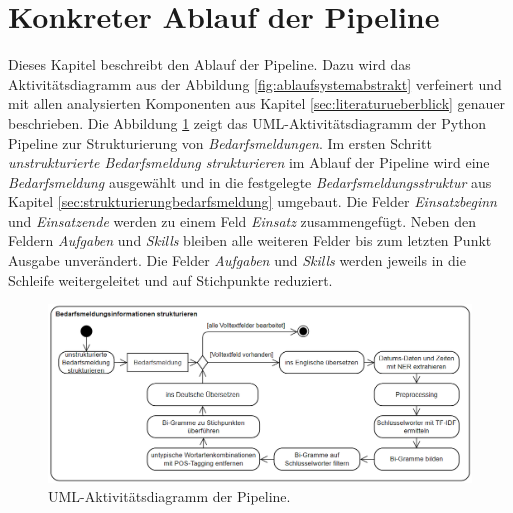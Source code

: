 \section{Konkreter Ablauf der Pipeline}
Dieses Kapitel beschreibt den Ablauf der Pipeline. Dazu wird das Aktivitätsdiagramm aus der Abbildung \ref{fig:ablaufsystemabstrakt} verfeinert und mit allen analysierten Komponenten aus Kapitel \ref{sec:literaturueberblick} genauer beschrieben. Die Abbildung \ref{fig:flowchart} zeigt das UML-Aktivitätsdiagramm der Python Pipeline zur Strukturierung von \emph{Bedarfsmeldungen}. Im ersten Schritt \emph{unstrukturierte Bedarfsmeldung strukturieren} im Ablauf der Pipeline wird eine \emph{Bedarfsmeldung} ausgewählt und in die festgelegte \emph{Bedarfsmeldungsstruktur} aus Kapitel \ref{sec:strukturierungbedarfsmeldung} umgebaut. Die Felder \emph{Einsatzbeginn} und \emph{Einsatzende} werden zu einem Feld \emph{Einsatz} zusammengefügt. Neben den Feldern \emph{Aufgaben} und \emph{Skills} bleiben alle weiteren Felder bis zum letzten Punkt Ausgabe unverändert. Die Felder \emph{Aufgaben} und \emph{Skills} werden jeweils in die Schleife weitergeleitet und auf Stichpunkte reduziert.
\begin{figure}[H]
	\centering  
	\includegraphics[width=\linewidth]{Abbildungen/flowchart.png}
	\caption{UML-Aktivitätsdiagramm der Pipeline.}
	\label{fig:flowchart}
\end{figure}\mbox{} \\
